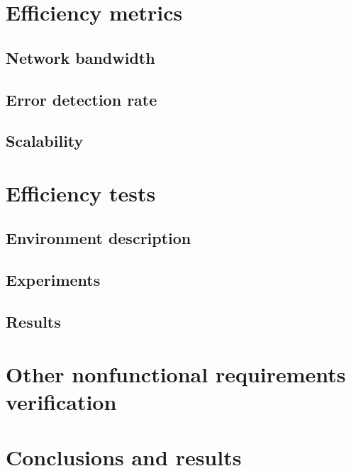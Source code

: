 	\section{Efficiency metrics}
		\subsection{Network bandwidth}
		\subsection{Error detection rate}
		\subsection{Scalability}
	\section{Efficiency tests}
		\subsection{Environment description}
		\subsection{Experiments}
		\subsection{Results}
	\section{Other nonfunctional requirements verification}
	\section{Conclusions and results}

